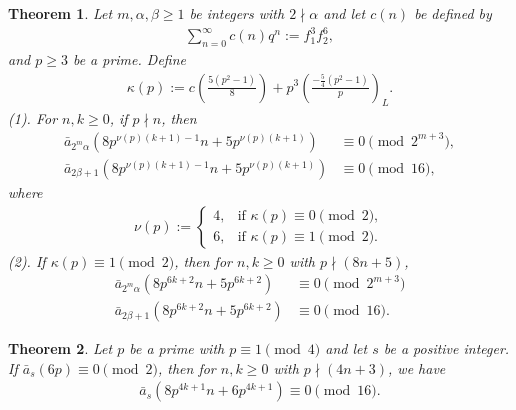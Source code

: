 \documentclass[11pt,a4paper]{article}
\numberwithin{equation}{section}
\theoremstyle{plain}
\newtheorem{theorem}{Theorem}[section]
\begin{document}
\begin{theorem}\label{t8n5}
		Let $m,\alpha,\beta \ge1$ be integers with $2\nmid \alpha$ and let $c(n)$ be defined by
	\begin{align}\label{e8n51}
		\sum_{n=0}^{\infty}c(n)q^n:= f_1^3 f_2^6,
	\end{align}
	and $p\ge 3$ be a prime. Define
	\begin{align}\label{e8n52}
		\kappa(p):= c\displaystyle\left(\frac{5(p^2-1)}{8}\right) + p^3\displaystyle\left(\frac{-\frac{5}{4}(p^2-1)}{p}\right)_L.
	\end{align}
	(1). For $n,k\ge0$, if $p\nmid n$, then
	\begin{align}\label{e8n53}
		\bar{a}_{2^m\alpha}\displaystyle\left(8p^{\nu(p)(k+1)-1}n + 5p^{\nu(p)(k+1)}\right) &\equiv0\pmod{2^{m+3}},\\
		\bar{a}_{2\beta+1}\left(8p^{\nu(p)(k+1)-1}n + 5p^{\nu(p)(k+1)}\right)&\equiv 0\pmod {16},
	\end{align}
	where
	\begin{align}\label{e8n54}
		\nu(p) :=\begin{cases}
			4, & \text{if } \kappa(p) \equiv 0\pmod 2,\\[4pt]
			6, & \text{if } \kappa(p) \equiv 1\pmod2.
		\end{cases}
	\end{align}
	(2). If $\kappa(p)\equiv1\pmod2$, then for $n,k\ge0$ with $p\nmid (8n+5)$,
	\begin{align}\label{e8n55}
		\bar{a}_{2^m\alpha}\displaystyle\left(8p^{6k+2}n + 5p^{6k+2}\right) &\equiv0\pmod {2^{m+3}}\\
		\bar{a}_{2\beta+1}\left(8p^{6k+2}n + 5p^{6k+2}\right)&\equiv 0\pmod {16}.
	\end{align}
\end{theorem}
 \begin{theorem}\label{t8n6}
 	Let $p$ be a prime with $p\equiv 1\pmod 4$ and let $s$ be a positive integer. If $\bar{a}_s(6p)\equiv 0\pmod 2$, then for $n,k\ge 0$ with $p\nmid(4n+3)$, we have
 	\begin{align*}
 		\bar{a}_s\left(8p^{4k+1}n+6p^{4k+1}\right)\equiv 0\pmod {16}.
 	\end{align*}
 \end{theorem}
\end{document}
